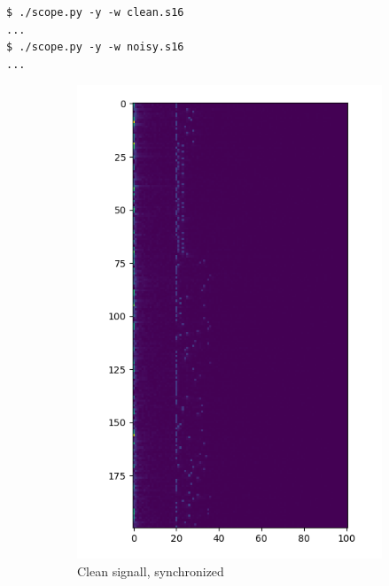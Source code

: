 \documentclass[a4paper]{article}
\begin{document}
\begin{lstlisting}
$ ./scope.py -y -w clean.s16
...
$ ./scope.py -y -w noisy.s16
...
\end{lstlisting}

\begin{figure}[H]
    \centering
    \begin{subfigure}[b]{0.45\textwidth}
        \includegraphics[width=1\textwidth]{waterfall_sync_clean.png}
        \caption{Clean signall, synchronized}
    \end{subfigure}
    \begin{subfigure}[b]{0.45\textwidth}

\end{subfigure}
\end{figure}
\end{document}
